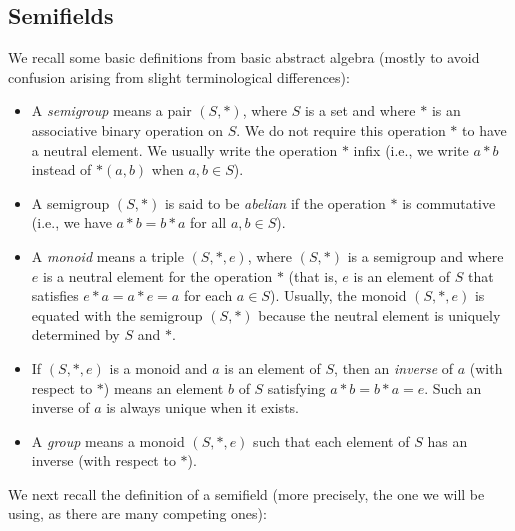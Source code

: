 \documentclass[numbers=enddot,12pt,final,onecolumn,notitlepage]{scrartcl}%
\theoremstyle{definition}
\begin{document}
\subsection{Semifields}

We recall some basic definitions from basic abstract algebra (mostly to avoid
confusion arising from slight terminological differences):

\begin{itemize}
\item A \emph{semigroup} means a pair $\left(  S,\ast\right)  $, where $S$ is
a set and where $\ast$ is an associative binary operation on $S$. We do not
require this operation $\ast$ to have a neutral element. We usually write the
operation $\ast$ infix (i.e., we write $a\ast b$ instead of $\ast\left(
a,b\right)  $ when $a,b\in S$).

\item A semigroup $\left(  S,\ast\right)  $ is said to be \emph{abelian} if
the operation $\ast$ is commutative (i.e., we have $a\ast b=b\ast a$ for all
$a,b\in S$).

\item A \emph{monoid} means a triple $\left(  S,\ast,e\right)  $, where
$\left(  S,\ast\right)  $ is a semigroup and where $e$ is a neutral element
for the operation $\ast$ (that is, $e$ is an element of $S$ that satisfies
$e\ast a=a\ast e=a$ for each $a\in S$). Usually, the monoid $\left(
S,\ast,e\right)  $ is equated with the semigroup $\left(  S,\ast\right)  $
because the neutral element is uniquely determined by $S$ and $\ast$.

\item If $\left(  S,\ast,e\right)  $ is a monoid and $a$ is an element of $S$,
then an \emph{inverse} of $a$ (with respect to $\ast$) means an element $b$ of
$S$ satisfying $a\ast b=b\ast a=e$. Such an inverse of $a$ is always unique
when it exists.

\item A \emph{group} means a monoid $\left(  S,\ast,e\right)  $ such that each
element of $S$ has an inverse (with respect to $\ast$).
\end{itemize}

We next recall the definition of a semifield (more precisely, the one we will
be using, as there are many competing ones):
\end{document}
